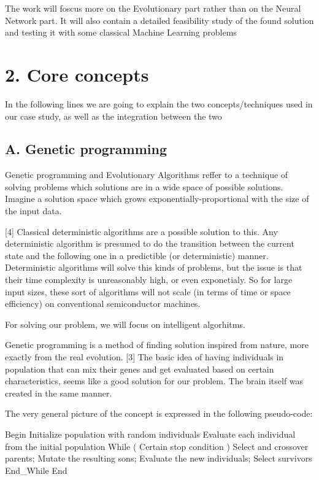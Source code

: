\documentclass[11pt]{article}
\begin{document}
The work will foscus more on the Evolutionary part rather than on the
Neural Network part. It will also contain a detailed feasibility study
of the found solution and testing it with some classical Machine
Learning problems

    \hypertarget{core-concepts}{%
\section{2. Core concepts}\label{core-concepts}}

In the following lines we are going to explain the two
concepts/techniques used in our case study, as well as the integration
between the two

    \hypertarget{a.-genetic-programming}{%
\subsection{A. Genetic programming}\label{a.-genetic-programming}}

Genetic programming and Evolutionary Algorithms reffer to a technique of
solving problems which solutions are in a wide space of possible
solutions. Imagine a solution space which grows
exponentially-proportional with the size of the input data.

{[}4{]} Classical deterministic algorithms are a possible solution to
this. Any deterministic algorithm is presumed to do the transition
between the current state and the following one in a predictible (or
deterministic) manner. Deterministic algorithms will solve this kinds of
problems, but the issue is that their time complexity is unreasonably
high, or even exponetialy. So for large input sizes, these sort of
algorithms will not scale (in terms of time or space efficiency) on
conventional semiconductor machines.

For solving our problem, we will focus on intelligent algorhitms.

Genetic programming is a method of finding solution inspired from
nature, more exactly from the real evolution. {[}3{]} The basic idea of
having individuals in population that can mix their genes and get
evaluated based on certain characteristics, seems like a good solution
for our problem. The brain itself was created in the same manner.

The very general picture of the concept is expressed in the following
pseudo-code:

    Begin Initialize population with random individuals Evaluate each
individual from the initial population While ( Certain stop condition )
Select and crossover parents; Mutate the resulting sons; Evaluate the
new individuals; Select survivors End\_While End 
\end{document}
